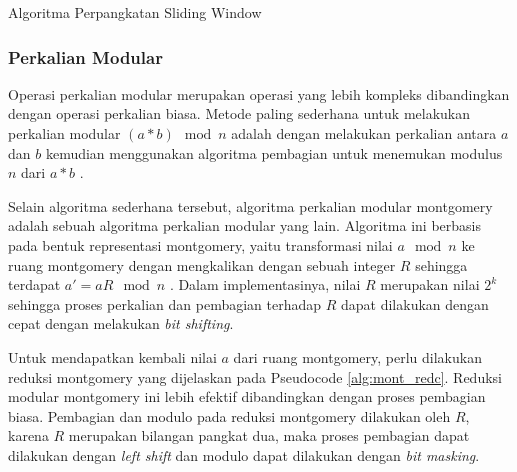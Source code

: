         \begin{algorithm}
          \caption{Algoritma Perpangkatan Sliding Window}
          \label{alg:window_exp}
          \begin{algorithmic}[1]
            \Statex

            \EndFor
            \State {}
            \EndFunction
          \end{algorithmic}
        \end{algorithm}

    \subsubsection{Perkalian Modular} \label{sec:modmul}
    Operasi perkalian modular merupakan operasi yang lebih kompleks dibandingkan dengan operasi perkalian biasa. Metode paling sederhana untuk melakukan perkalian modular $(a*b) \mod n$ adalah dengan melakukan perkalian antara $a$ dan $b$ kemudian menggunakan algoritma pembagian untuk menemukan modulus $n$ dari $a*b$ \citep{applied_crypto}.

    Selain algoritma sederhana tersebut, algoritma perkalian modular montgomery adalah sebuah algoritma perkalian modular yang lain. Algoritma ini berbasis pada bentuk representasi montgomery, yaitu transformasi nilai $a \mod n$ ke ruang montgomery dengan mengkalikan dengan sebuah integer $R$ sehingga terdapat $a' = aR \mod n$ \citep{mont_mul_bertoni}. Dalam implementasinya, nilai $R$ merupakan nilai $2^k$ sehingga proses perkalian dan pembagian terhadap $R$ dapat dilakukan dengan cepat dengan melakukan \textit{bit shifting}.

    Untuk mendapatkan kembali nilai $a$ dari ruang montgomery, perlu dilakukan reduksi montgomery yang dijelaskan pada Pseudocode \ref{alg:mont_redc}. Reduksi modular montgomery ini lebih efektif dibandingkan dengan proses pembagian biasa. Pembagian dan modulo pada reduksi montgomery dilakukan oleh $R$, karena $R$ merupakan bilangan pangkat dua, maka proses pembagian dapat dilakukan dengan \textit{left shift} dan modulo dapat dilakukan dengan \textit{bit masking}.

